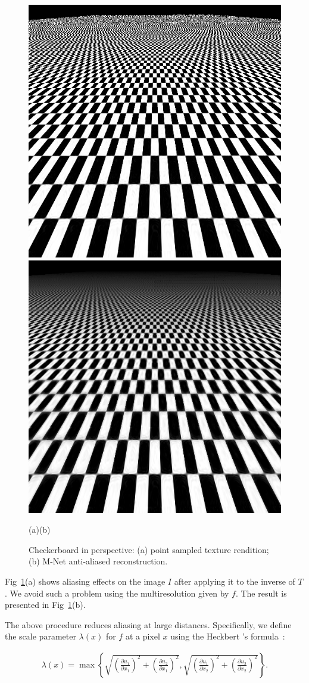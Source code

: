 \begin{figure}[!h]
\centering
\includegraphics[width=0.46\linewidth]{img/ch5/im_0_alias.png}
\includegraphics[width=0.46\linewidth]{img/ch5/im_0_anti_alias.png}
\centerline{(a)\hfil\hfil(b)}
\caption{Checkerboard in perspective: (a) point sampled texture rendition; (b) M-Net anti-aliased reconstruction.}
\label{f:alias}
\end{figure}

Fig~\ref{f:alias}(a) shows aliasing effects on the image $I$ after applying it to the inverse of $T$. We avoid such a problem using the multiresolution given by $f$. The result is presented in Fig~\ref{f:alias}(b). 

The above procedure reduces aliasing at large distances. Specifically,
we define the scale parameter $\lambda(x)$ for $f$ at a pixel $x$ using the Heckbert 's formula~\cite{heckbert1983texture}:

\begin{align*}
    \lambda(x)=\max\left\{\sqrt{\left(\frac{\partial u_1}{\partial x_1}\right)^2+\left(\frac{\partial u_2}{\partial x_1}\right)^2}, \sqrt{\left(\frac{\partial u_1}{\partial x_2}\right)^2+\left(\frac{\partial u_2}{\partial x_2}\right)^2}\right\}.
\end{align*}

